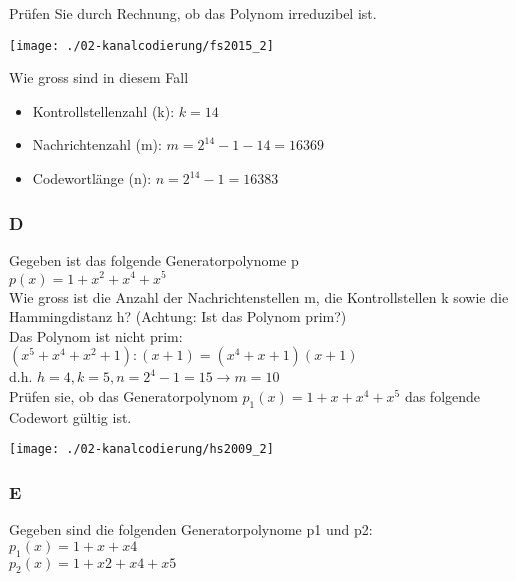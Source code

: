 Prüfen Sie durch Rechnung, ob das Polynom irreduzibel ist.
\begin{center}
    \vspace{-8pt}
    \texttt{[image: ./02-kanalcodierung/fs2015\_2]}
    \vspace{-8pt}
\end{center}

Wie gross sind in diesem Fall
\begin{itemize}
    \item Kontrollstellenzahl (k): $k=14$
    \item Nachrichtenzahl (m): $m=2^{14}-1-14=16369$
    \item Codewortlänge (n): $n=2^{14}-1=16383$
\end{itemize}

\subsubsection{D}
Gegeben ist das folgende Generatorpolynome p\\
$p(x)=1+x^2+x^4+x^5$\\

Wie gross ist die Anzahl der Nachrichtenstellen m, die Kontrollstellen k sowie die Hammingdistanz h? (Achtung: Ist das Polynom prim?)\\
Das Polynom ist nicht prim:\\
$(x^5+x^4+x^2+1):(x+1)=(x^4+x+1)(x+1)$\\
d.h. $h=4,k=5,n=2^4-1=15 \rightarrow m=10$\\

Prüfen sie, ob das Generatorpolynom $p_1(x)=1+x+x^4+x^5$ das folgende Codewort gültig ist.\\
\begin{center}
    \vspace{-8pt}
    \texttt{[image: ./02-kanalcodierung/hs2009\_2]}
    \vspace{-8pt}
\end{center}

\columnbreak

\subsubsection{E}
Gegeben sind die folgenden Generatorpolynome p1 und p2:\\
$p_1(x)=1+x+x4$\\
$p_2(x)=1+x2+x4+x5$\\

